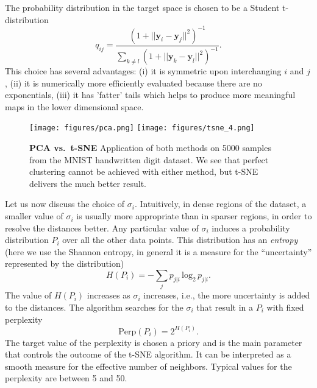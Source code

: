 The probability distribution in the target space is chosen to be a Student t-distribution
\begin{equation}
q_{ij}=\frac{
(1+||\bm{y}_i-\bm{y}_j||^2)^{-1}
}{
\sum_{k\neq l}
(1+||\bm{y}_k-\bm{y}_l||^2)^{-1}
}.
\end{equation}
This choice has several advantages: (i) it is symmetric upon interchanging $i$ and $j$, (ii) it is numerically more efficiently evaluated because there are no exponentials, (iii) it has 'fatter' tails which helps to produce more meaningful maps in the lower dimensional space. 


\begin{figure*}[t]
    \texttt{[image: figures/pca.png]}
    \texttt{[image: figures/tsne\_4.png]}
    \caption{\textbf{PCA vs.\ t-SNE} Application of both methods on 5000 samples from the MNIST handwritten digit dataset. We see that perfect clustering cannot be achieved with either method, but t-SNE delivers the much better result.}
\label{fig: PCA vs tsne}
\end{figure*}

Let us now discuss the choice of $\sigma_i$. Intuitively, in dense regions of the dataset, a smaller value of $\sigma_i$ is usually more appropriate than in sparser regions, in order to resolve the distances better. Any particular value of $\sigma_i$ induces a probability distribution $P_i$ over all the other data points. This distribution has an \emph{entropy} (here we use the Shannon entropy, in general it is a measure for the ``uncertainty'' represented by the distribution)
\begin{equation}
H(P_i)=-\sum_j p_{j|i}\, \mathrm{log}_2 \,p_{j|i}.
\end{equation}
The value of $H(P_i)$ increases as $\sigma_i$ increases, i.e., the more uncertainty is added to the distances. The algorithm searches for the $\sigma_i$ that result in a $P_i$ with fixed perplexity 
\begin{equation}
\mathrm{Perp}(P_i)=2^{H(P_i)}.
\end{equation}
The target value of the perplexity is chosen a priory and is the main parameter that controls the outcome of the t-SNE algorithm. It can be interpreted as a smooth measure for the effective number of neighbors. Typical values for the perplexity are between 5 and 50. 

